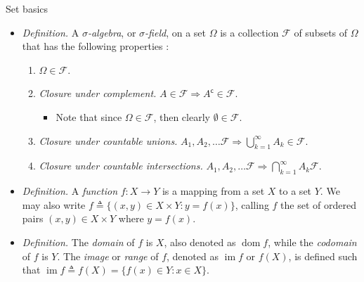 \documentclass{beamer}
\numberwithin{equation}{section}
\begin{document}
\begin{frame}{Set basics}
    \begin{itemize}
        \item
        \textit{Definition.} A  $ \sigma $\textit{-algebra}, or
        $ \sigma $\textit{-field}, on a set $ \Omega $ is a collection
        $ \mathcal{F} $ of subsets of $ \Omega $ that has the following
        properties \cite{tamuz_prob}:
        \begin{enumerate}
            \item
            $ \Omega \in \mathcal{F} $.

            \item
            \textit{Closure under complement.} $ A \in \mathcal{F} \Rightarrow
            A^\mathsf{c} \in \mathcal{F} $.
            \begin{itemize}
                \item
                Note that since $ \Omega \in \mathcal{F} $, then clearly
                $ \emptyset \in \mathcal{F} $.
            \end{itemize}

            \item
            \textit{Closure under countable unions.} $ A_1, A_2, \ldots
            \mathcal{F} \Rightarrow \bigcup_{k = 1}^\infty
            A_k \in \mathcal{F} $.

            \item
            \textit{Closure under countable intersections.} $ A_1, A_2,
            \ldots \mathcal{F} \Rightarrow \bigcap_{k = 1}^\infty A_k
            \mathcal{F} $.
        \end{enumerate}

        \item
        \textit{Definition.} A \textit{function} $ f : X \rightarrow Y $ is a
        mapping from a set $ X $ to a set $ Y $. We may also write
        $ f \triangleq \{(x, y) \in X \times Y : y = f(x)\} $, calling $ f $
        the set of ordered pairs $ (x, y) \in X \times Y $ where $ y = f(x) $.

        \item
        \textit{Definition.} The \textit{domain} of $ f $ is $ X $, also
        denoted as $ \operatorname{dom} f $, while the \textit{codomain} of
        $ f $ is $ Y $. The \textit{image} or \textit{range} of $ f $, denoted
        as $ \operatorname{im} f $ or $ f(X) $, is defined such that
        $ \operatorname{im} f \triangleq f(X) = \{f(x) \in Y : x \in X\} $.
    \end{itemize}
\end{frame}
\end{document}
